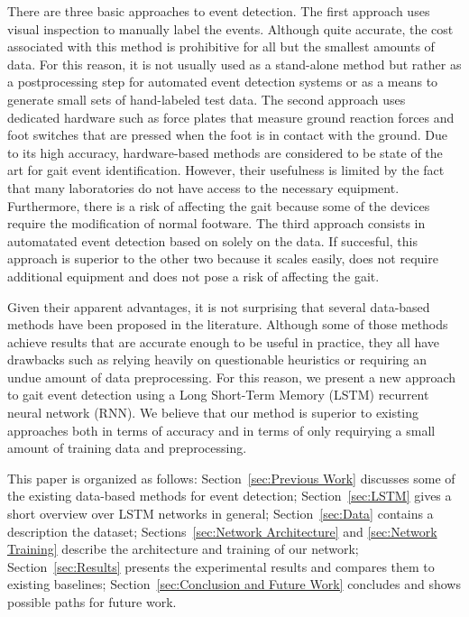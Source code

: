 \documentclass{acm_proc_article-sp}
\begin{document}

There are three basic approaches to event detection.
The first approach uses visual inspection to manually label the events.
Although quite accurate, the cost associated with this method is prohibitive for
all but the smallest amounts of data.
For this reason, it is not usually used as a stand-alone method but rather as a
postprocessing step for automated event detection systems or as a means to
generate small sets of hand-labeled test data.
The second approach uses dedicated hardware such as force plates that measure
ground reaction forces and foot switches that are pressed when the foot is in
contact with the ground.
Due to its high accuracy, hardware-based methods are considered to be
state of the art for gait event identification.
However, their usefulness is limited by the fact that many laboratories do not
have access to the necessary equipment.
Furthermore, there is a risk of affecting the gait because some of the devices
require the modification of normal footware.
The third approach consists in automatated event detection based on solely on
the data.
If succesful, this approach is superior to the other two because it scales
easily, does not require additional equipment and does not pose a risk of
affecting the gait.

Given their apparent advantages, it is not surprising that several data-based
methods have been proposed in the literature.
Although some of those methods achieve results that are accurate enough to be
useful in practice, they all have drawbacks such as relying heavily on
questionable heuristics or requiring an undue amount of data preprocessing.
For this reason, we present a new approach to gait event detection using a
Long Short-Term Memory (LSTM) recurrent neural network (RNN).
We believe that our method is superior to existing approaches both in terms of
accuracy and in terms of only requirying a small amount of training data and
preprocessing.


This paper is organized as follows:
Section~\ref{sec:Previous Work}
discusses some of the existing data-based methods for event detection;
Section~\ref{sec:LSTM}
gives a short overview over LSTM networks in general;
Section~\ref{sec:Data}
contains a description the dataset;
Sections~\ref{sec:Network Architecture} and \ref{sec:Network Training}
describe the architecture and training of our network;
Section~\ref{sec:Results}
presents the experimental results and compares them to existing baselines;
Section~\ref{sec:Conclusion and Future Work}
concludes and shows possible paths for future work.
\end{document}
